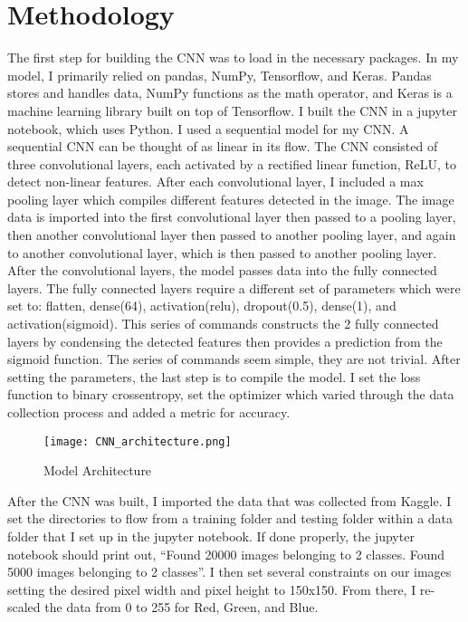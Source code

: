 \documentclass[12pt,english]{article}
\begin{document}
\section{Methodology}
The first step for building the CNN was to load in the necessary packages. In my model, I primarily relied on pandas, NumPy, Tensorflow, and Keras. Pandas stores and handles data, NumPy functions as the math operator, and Keras is a machine learning library built on top of Tensorflow. I built the CNN in a jupyter notebook, which uses Python. I used a sequential model for my CNN. A sequential CNN can be thought of as linear in its flow. The CNN consisted of three convolutional layers, each activated by a rectified linear function, ReLU, to detect non-linear features. After each convolutional layer, I included a max pooling layer which compiles different features detected in the image. The image data is imported into the first convolutional layer then passed to a pooling layer, then another convolutional layer then passed to another pooling layer, and again to another convolutional layer, which is then passed to another pooling layer. After the convolutional layers, the model passes data into the fully connected layers. The fully connected layers require a different set of parameters which were set to: flatten, dense(64), activation(relu), dropout(0.5), dense(1), and activation(sigmoid). This series of commands constructs the 2 fully connected layers by condensing the detected features then provides a prediction from the sigmoid function. The series of commands seem simple, they are not trivial. After setting the parameters, the last step is to compile the model. I set the loss function to binary crossentropy, set the optimizer which varied through the data collection process and added a metric for accuracy. \par

\begin{figure}[h!]
\centering
\texttt{[image: CNN\_architecture.png]}
\caption{Model Architecture}
\label{fig:universe}
\end{figure}

After the CNN was built, I imported the data that was collected from Kaggle. I set the directories to flow from a training folder and testing folder within a data folder that I set up in the jupyter notebook. If done properly, the jupyter notebook should print out, ``Found 20000 images belonging to 2 classes. Found 5000 images belonging to 2 classes''. I then set several constraints on our images setting the desired pixel width and pixel height to 150x150. From there, I re-scaled the data from 0 to 255 for Red, Green, and Blue. \par
\end{document}
